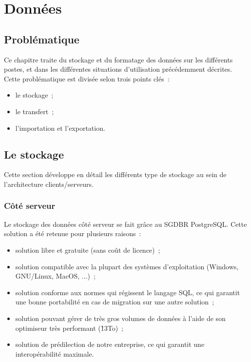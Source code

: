 \section{Données}\label{DonneesTechnique}

% 

\subsection{Problématique}
Ce chapitre traite du stockage et du formatage des données sur les différents postes, et dans les différentes situations d'utilisation précédemment décrites.
Cette problématique est divisée selon trois points clés~:
\begin{itemize}
	\item le stockage~;
	\item le transfert~;
	\item l'importation et l'exportation.
\end{itemize}

\subsection{Le stockage}
Cette section développe en détail les différents type de stockage au sein de l'architecture clients/serveurs.

\subsubsection{Côté serveur}
Le stockage des données côté serveur se fait grâce au SGDBR PostgreSQL. Cette solution a été retenue pour plusieurs raisons~:
\begin{itemize}
	\item solution libre et gratuite (sans coût de licence)~;
	\item solution compatible avec la plupart des systèmes d'exploitation (Windows, GNU/Linux, MacOS, ...)~;
	\item solution conforme aux normes qui régissent le langage SQL, ce qui garantit une bonne portabilité en cas de migration sur une autre solution~;
	\item solution pouvant gérer de très gros volumes de données à l'aide de son optimiseur très performant (\~ 13To)~;
	\item solution de prédilection de notre entreprise, ce qui garantit une interopérabilité maximale.
\end{itemize}

